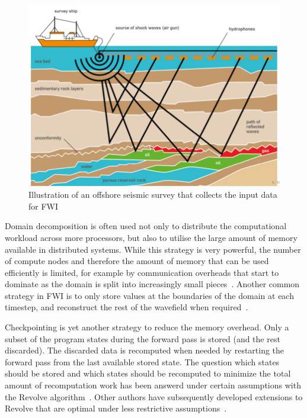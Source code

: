 \documentclass[conference]{IEEEtran}
\begin{document}
\begin{figure}
\begin{center}
\includegraphics[width=0.8\linewidth]{images/survey-ship-diagram.png}
\end{center}
\caption{Illustration of an offshore seismic survey that collects the input data for FWI}
\label{fig:offshore_survey}
\end{figure}

Domain decomposition is often used not only to distribute the computational
workload across more processors, but also to utilise the large amount of memory
available in distributed systems. While this strategy is very powerful, the
number of compute nodes and therefore the amount of memory that can be used
efficiently is limited, for example by communication overheads that start to
dominate as the domain is split into increasingly small
pieces~\cite{virieux2009seismic}.
Another common strategy in FWI is to only store values at the boundaries of the
domain at each timestep, and reconstruct the rest of the wavefield when
required~\cite{clapp2009reverse,yang2014rtm}.

Checkpointing is yet another strategy to reduce the memory overhead. Only a
subset of the program states during the forward pass is stored (and the rest
discarded).  The discarded data is recomputed when needed by restarting the
forward pass from the last available stored state. The question which states
should be stored and which states should be recomputed to minimize the total
amount of recomputation work has been answerd under certain assumptions with the
Revolve algorithm~\cite{griewank2000algorithm}.  Other authors have subsequently
developed extensions to Revolve that are optimal under less restrictive
assumptions~\cite{wang2009minimal,aupy2016optimal,schanen2016asynchronous}.
\end{document}
